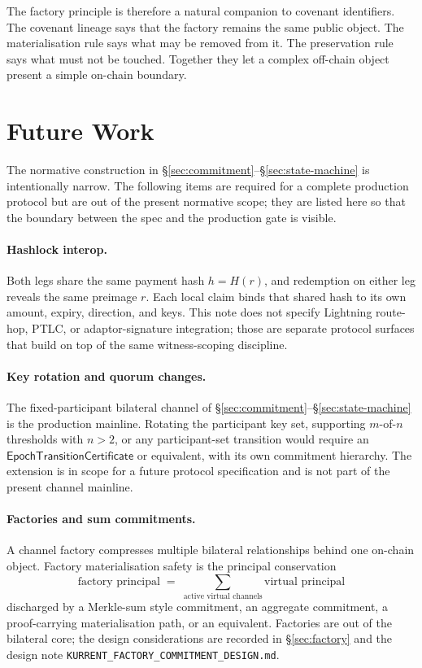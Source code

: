 \documentclass[10pt,a4paper]{article}
\begin{document}
The factory principle is therefore a natural companion to covenant identifiers. The covenant lineage says that the factory remains the same public object. The materialisation rule says what may be removed from it. The preservation rule says what must not be touched. Together they let a complex off-chain object present a simple on-chain boundary.

\section{Future Work}
\label{sec:future-work}

The normative construction in §\ref{sec:commitment}--§\ref{sec:state-machine} is intentionally narrow. The following items are required for a complete production protocol but are out of the present normative scope; they are listed here so that the boundary between the spec and the production gate is visible.

\paragraph{Hashlock interop.} Both legs share the same payment hash $h = H(r)$, and redemption on either leg reveals the same preimage $r$. Each local claim binds that shared hash to its own amount, expiry, direction, and keys. This note does not specify Lightning route-hop, PTLC, or adaptor-signature integration; those are separate protocol surfaces that build on top of the same witness-scoping discipline.

\paragraph{Key rotation and quorum changes.} The fixed-participant bilateral channel of §\ref{sec:commitment}--§\ref{sec:state-machine} is the production mainline. Rotating the participant key set, supporting $m$-of-$n$ thresholds with $n > 2$, or any participant-set transition would require an $\mathsf{EpochTransitionCertificate}$ or equivalent, with its own commitment hierarchy. The extension is in scope for a future protocol specification and is not part of the present channel mainline.

\paragraph{Factories and sum commitments.} A channel factory compresses multiple bilateral relationships behind one on-chain object. Factory materialisation safety is the principal conservation
\[
  \text{factory principal} \;=\; \sum_{\text{active virtual channels}} \text{virtual principal}
\]
discharged by a Merkle-sum style commitment, an aggregate commitment, a proof-carrying materialisation path, or an equivalent. Factories are out of the bilateral core; the design considerations are recorded in §\ref{sec:factory} and the design note \texttt{KURRENT\_FACTORY\_COMMITMENT\_DESIGN.md}.
\end{document}
